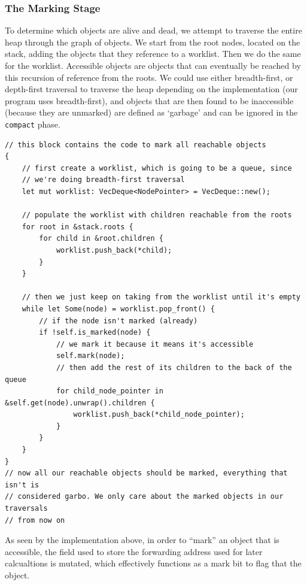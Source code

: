 \documentclass[index]{subfiles}
\begin{document}
\subsubsection{The Marking Stage}

To determine which objects are alive and dead, we attempt to traverse the entire heap through the graph of objects. We start from the root nodes, located on the stack\cites[3..~Marking]{redhat_openjdk}[Chapter~3]{gc_handbook}, adding the objects that they reference to a worklist. Then we do the same for the worklist. Accessible objects are objects that can eventually be reached by this recursion of reference from the roots. We could use either breadth-first, or depth-first traversal to traverse the heap depending on the implementation (our program uses breadth-first), and objects that are then found to be inaccessible (because they are unmarked) are defined as `garbage' and can be ignored in the \verb+compact+ phase.

\begin{verbatim}
// this block contains the code to mark all reachable objects
{
    // first create a worklist, which is going to be a queue, since
    // we're doing breadth-first traversal
    let mut worklist: VecDeque<NodePointer> = VecDeque::new();

    // populate the worklist with children reachable from the roots
    for root in &stack.roots {
        for child in &root.children {
            worklist.push_back(*child);
        }
    }

    // then we just keep on taking from the worklist until it's empty
    while let Some(node) = worklist.pop_front() {
        // if the node isn't marked (already)
        if !self.is_marked(node) {
            // we mark it because it means it's accessible
            self.mark(node);
            // then add the rest of its children to the back of the queue
            for child_node_pointer in &self.get(node).unwrap().children {
                worklist.push_back(*child_node_pointer);
            }
        }
    }
}
// now all our reachable objects should be marked, everything that isn't is
// considered garbo. We only care about the marked objects in our traversals
// from now on
\end{verbatim}

As seen by the implementation above, in order to ``mark'' an object that is accessible, the field used to store the forwarding address used for later calcualtions is mutated, which effectively functions as a mark bit to flag that the object. \cite[Chapter~1]{gc_handbook}
\end{document}
